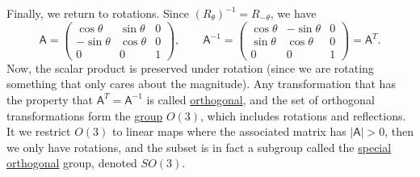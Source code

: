 \documentclass[10pt,notitlepage]{revtex4-1}
\begin{document}
Finally, we return to rotations. Since $(R_\theta)^{-1}=R_{-\theta}$, we have
\begin{equation}
	\mathsf{A}=\begin{pmatrix}\cos\theta&\sin\theta&0\\
	-\sin\theta&\cos\theta&0\\0&0&1\end{pmatrix},\qquad
	\mathsf{A}^{-1}=\begin{pmatrix}\cos\theta&-\sin\theta&0\\
	\sin\theta&\cos\theta&0\\0&0&1\end{pmatrix}=\mathsf{A}^{T}.
\end{equation}
Now, the scalar product is preserved under rotation (since we are rotating
something that only cares about the magnitude). Any transformation that has the
property that $\mathsf{A}^{T}=\mathsf{A}^{-1}$ is called \underline{orthogonal},
and the set of orthogonal transformations form the \underline{group} $O(3)$,
which includes rotations and reflections. It we restrict $O(3)$ to linear maps
where the associated matrix has $|\mathsf{A}|>0$, then we only have rotations,
and the subset is in fact a subgroup called the \underline{special orthogonal}
group, denoted $SO(3)$.






\end{document}
